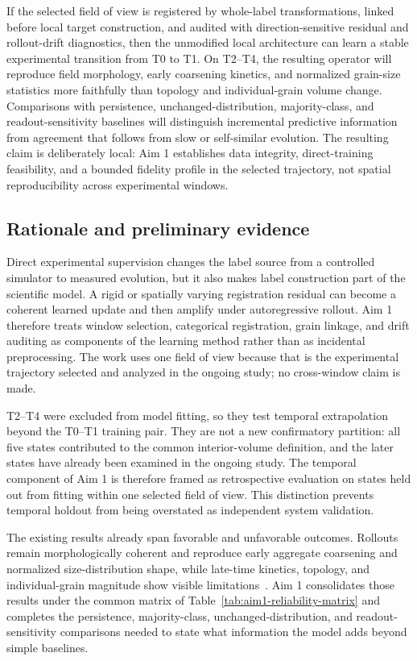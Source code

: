 \documentclass[proposalMode]{ufdissertation}
\begin{document}
If the selected field of view is registered by whole-label transformations, linked before local target construction, and audited with direction-sensitive residual and rollout-drift diagnostics, then the unmodified local architecture can learn a stable experimental transition from T0 to T1. On T2--T4, the resulting operator will reproduce field morphology, early coarsening kinetics, and normalized grain-size statistics more faithfully than topology and individual-grain volume change. Comparisons with persistence, unchanged-distribution, majority-class, and readout-sensitivity baselines will distinguish incremental predictive information from agreement that follows from slow or self-similar evolution. The resulting claim is deliberately local: Aim 1 establishes data integrity, direct-training feasibility, and a bounded fidelity profile in the selected trajectory, not spatial reproducibility across experimental windows.

\subsection{Rationale and preliminary evidence}

Direct experimental supervision changes the label source from a controlled simulator to measured evolution, but it also makes label construction part of the scientific model. A rigid or spatially varying registration residual can become a coherent learned update and then amplify under autoregressive rollout. Aim 1 therefore treats window selection, categorical registration, grain linkage, and drift auditing as components of the learning method rather than as incidental preprocessing. The work uses one field of view because that is the experimental trajectory selected and analyzed in the ongoing study; no cross-window claim is made.

T2--T4 were excluded from model fitting, so they test temporal extrapolation beyond the T0--T1 training pair. They are not a new confirmatory partition: all five states contributed to the common interior-volume definition, and the later states have already been examined in the ongoing study. The temporal component of Aim 1 is therefore framed as retrospective evaluation on states held out from fitting within one selected field of view. This distinction prevents temporal holdout from being overstated as independent system validation.

The existing results already span favorable and unfavorable outcomes. Rollouts remain morphologically coherent and reproduce early aggregate coarsening and normalized size-distribution shape, while late-time kinetics, topology, and individual-grain magnitude show visible limitations~\cite{tian2026experiment}. Aim 1 consolidates those results under the common matrix of Table~\ref{tab:aim1-reliability-matrix} and completes the persistence, majority-class, unchanged-distribution, and readout-sensitivity comparisons needed to state what information the model adds beyond simple baselines.
\end{document}
